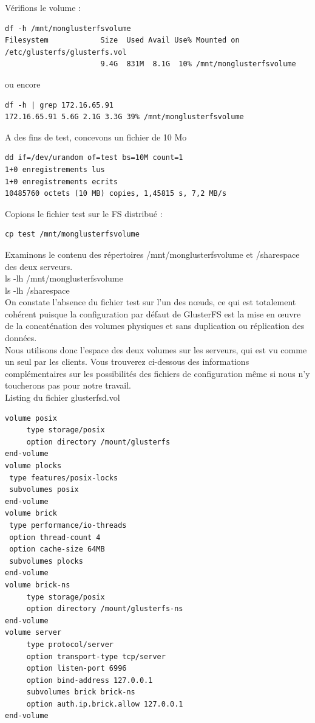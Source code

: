 \documentclass[12pt]{report}
\begin{document}
Vérifions le volume :
\begin{lstlisting}
df -h /mnt/monglusterfsvolume
Filesystem            Size  Used Avail Use% Mounted on
/etc/glusterfs/glusterfs.vol
                      9.4G  831M  8.1G  10% /mnt/monglusterfsvolume
	  \end{lstlisting}
ou encore
\begin{lstlisting}
df -h | grep 172.16.65.91
172.16.65.91 5.6G 2.1G 3.3G 39% /mnt/monglusterfsvolume
	  \end{lstlisting}
A des fins de test, concevons un fichier de 10 Mo
\begin{lstlisting}
dd if=/dev/urandom of=test bs=10M count=1
1+0 enregistrements lus
1+0 enregistrements ecrits
10485760 octets (10 MB) copies, 1,45815 s, 7,2 MB/s
	  \end{lstlisting}
Copions le fichier test sur le FS distribué :
\begin{lstlisting}
cp test /mnt/monglusterfsvolume
	  \end{lstlisting}
Examinons le contenu des répertoires /mnt/monglusterfsvolume et /sharespace des deux serveurs.\\
ls -lh /mnt/monglusterfsvolume\\
ls -lh /sharespace\\
On constate l'absence du fichier test sur l'un des nœuds, ce qui est totalement cohérent puisque la configuration par défaut de GlusterFS est la mise en œuvre de la concaténation des volumes physiques et sans duplication ou réplication des données.\\
Nous utilisons donc l'espace des deux volumes sur les serveurs, qui est vu comme un seul par les clients.
Vous trouverez ci-dessous des informations complémentaires sur les possibilités des fichiers de configuration même si nous n'y toucherons pas pour notre travail.\\
\newpage
Listing du fichier glusterfsd.vol
\begin{lstlisting}
volume posix
     type storage/posix
     option directory /mount/glusterfs
end-volume
volume plocks
 type features/posix-locks
 subvolumes posix
end-volume
volume brick
 type performance/io-threads
 option thread-count 4
 option cache-size 64MB
 subvolumes plocks
end-volume
volume brick-ns
     type storage/posix
     option directory /mount/glusterfs-ns
end-volume
volume server
     type protocol/server
     option transport-type tcp/server
     option listen-port 6996
     option bind-address 127.0.0.1
     subvolumes brick brick-ns
     option auth.ip.brick.allow 127.0.0.1
end-volume
	  \end{lstlisting}
\end{document}
